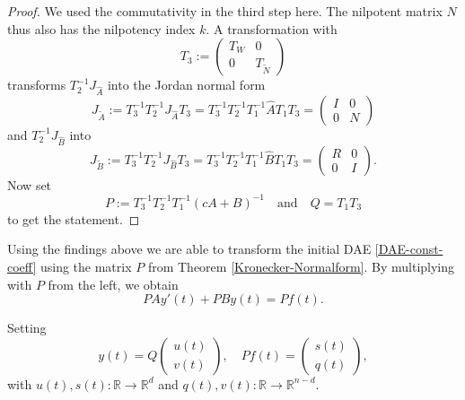 \begin{proof}
	We used the commutativity in the third step here. The nilpotent matrix $N$ thus also has the nilpotency index $k$. A transformation with
	\begin{displaymath}
		T_3 := 
		\left(
		\begin{matrix}
			T_W & 0 \\
			0 & T_{\tilde{N}}
		\end{matrix}
		\right)
	\end{displaymath}
	transforms $T_2^{-1}J_{\hat{A}}$ into the Jordan normal form
	\begin{displaymath}
		J_{\tilde{A}} := T_3^{-1}T_2^{-1}J_{\hat{A}}T_3 = T_3^{-1}T_2^{-1}T_1^{-1}\hat{A}T_1T_3 = 
		\left(
		\begin{matrix}
			I & 0 \\
			0 & N
		\end{matrix}
		\right)
	\end{displaymath}
	and $T_2^{-1}J_{\hat{B}}$ into
	\begin{displaymath}
		J_{\tilde{B}} := T_3^{-1}T_2^{-1}J_{\hat{B}}T_3 = T_3^{-1}T_2^{-1}T_1^{-1}\hat{B}T_1T_3 = 
		\left(
		\begin{matrix}
			R & 0 \\
			0 & I
		\end{matrix}
		\right) .
	\end{displaymath}
	Now set
	\begin{displaymath}
		P:= T_3^{-1}T_2^{-1}T_1^{-1}(cA+B)^{-1} \quad \text{and} \quad Q = T_1T_3
	\end{displaymath}
	to get the statement.
\end{proof}

Using the findings above we are able to transform the initial DAE \eqref{DAE-const-coeff} using the matrix $P$ from Theorem \ref{Kronecker-Normalform}. By multiplying with $P$ from the left, we obtain
\begin{displaymath}
	P A y'(t) + P B y(t) = P f(t) .
\end{displaymath}

Setting
\begin{displaymath}
	y(t) = Q
	\left(
	\begin{matrix}
		u(t) \\
		v(t)
	\end{matrix}  
	\right) 
	, \quad
	Pf(t) = 
	\left(
	\begin{matrix}
		s(t) \\
		q(t)
	\end{matrix}
	\right),
\end{displaymath}
with $u(t),s(t) : \mathbb{R} \to \mathbb{R}^d$ and $q(t),v(t) : \mathbb{R} \to \mathbb{R}^{n-d}$.

